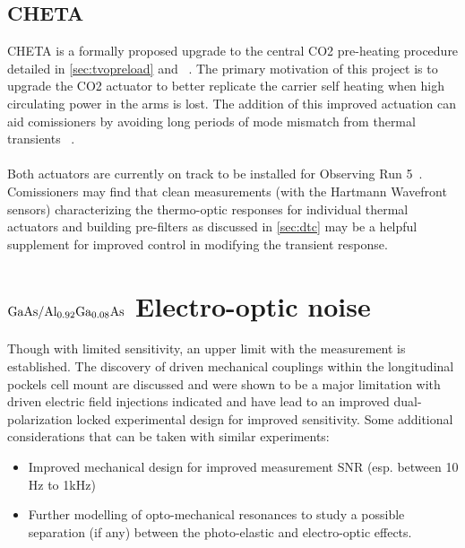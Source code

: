 \subsection*{CHETA}
CHETA is a formally proposed upgrade to the central CO2 pre-heating procedure detailed in \autoref{sec:tvopreload} and ~\cite{Hamedan:2018}. The primary motivation of this project is to upgrade the CO2 actuator to better replicate the carrier self heating when high circulating power in the arms is lost. The addition of this improved actuation can aid comissioners by avoiding long periods of mode mismatch from thermal transients ~\cite{cheta}. 
\\
\\
Both actuators are currently on track to be installed for Observing Run 5~\cite{O5tcssummary}. Comissioners may find that clean measurements (with the Hartmann Wavefront sensors) characterizing the thermo-optic responses for individual thermal actuators and building pre-filters as discussed in \autoref{sec:dtc} may be a helpful supplement for improved control in modifying the transient response.

\section{\texorpdfstring{$\mathrm{GaAs} / \mathrm{Al_{0.92}Ga_{0.08}As}$}{gaas/algaas} Electro-optic noise}
Though with limited sensitivity, an upper limit with the measurement is established. The discovery of driven mechanical couplings within the longitudinal pockels cell mount are discussed and were shown to be a major limitation with driven electric field injections indicated and have lead to an improved dual-polarization locked experimental design for improved sensitivity. Some additional considerations that can be taken with similar experiments:

\begin{itemize}
	\item Improved mechanical design for improved measurement SNR (esp. between 10 Hz to 1kHz)
	\item Further modelling of opto-mechanical resonances to study a possible separation (if any) between the photo-elastic and electro-optic effects.  
\end{itemize}
